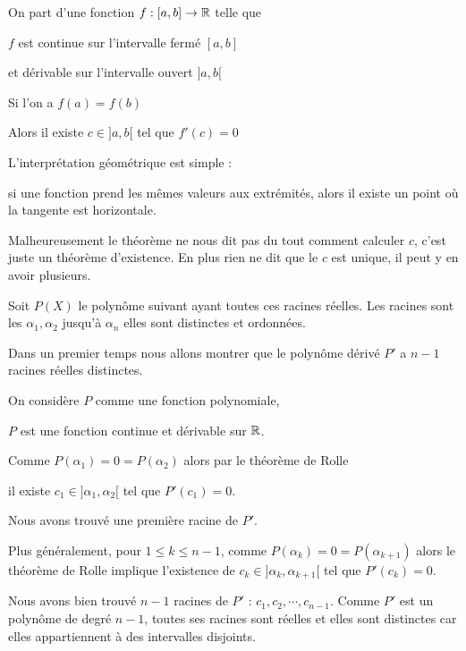 On part d'une fonction $f:[a,b] \to \mathbb{R}$ telle que 


  $f$ est continue sur l'intervalle fermé $[a,b]$


et dérivable  sur l'intervalle ouvert $]a,b[$


Si l'on a  $f(a)=f(b)$


Alors il existe $c \in ]a,b[$  tel que $f'(c)=0$

\change

L'interprétation géométrique est simple :

si une fonction prend les mêmes valeurs aux extrémités,
alors il existe un point où la tangente est horizontale.

Malheureusement le théorème ne nous dit pas du tout comment calculer $c$,
c'est juste un théorème d'existence. En plus rien ne dit que le $c$ est unique,
il peut y en avoir plusieurs.


\diapo

Soit $P(X)$ le polynôme suivant ayant toutes ces racines réelles.
Les racines sont les $\alpha_1,\alpha_2$ jusqu'à $\alpha_n$
elles sont distinctes et ordonnées.

\change

Dans un premier temps nous allons montrer que le polynôme dérivé
$P'$ a $n-1$ racines réelles distinctes.

\change

On considère $P$ comme une fonction polynomiale,

$P$ est une fonction continue et dérivable sur $\mathbb{R}$.

\change

Comme $P(\alpha_1)=0=P(\alpha_2)$ alors par le théorème de Rolle 

il existe $c_1 \in ]\alpha_1,\alpha_2[$ tel que $P'(c_1)=0$. 

Nous avons trouvé une première racine de $P'$.

\change

Plus généralement, pour $1 \le k \le n-1$, comme $P(\alpha_k)=0=P(\alpha_{k+1})$ alors
le théorème de Rolle implique l'existence de $c_k \in ]\alpha_k,\alpha_{k+1}[$ tel que $P'(c_k)=0$.

\change

Nous avons bien trouvé $n-1$ racines de $P'$ : $c_1, c_2 , \cdots , c_{n-1}$.
Comme $P'$ est un polynôme de degré $n-1$, toutes ses racines sont réelles 
et elles sont distinctes car elles appartiennent à des intervalles disjoints.

